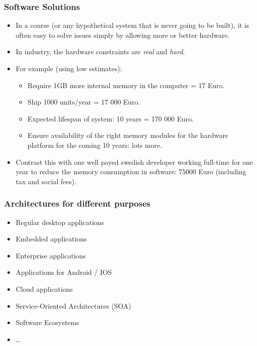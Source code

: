 \documentclass[10pt]{beamer}
\begin{document}
\begin{frame}[t]
\frametitle{Software Solutions}
\begin{itemize}
\item In a course (or any hypothetical system that is never going to be built), it is often easy to solve issues simply by allowing more or better hardware.
\item In industry, the hardware constraints are \emph{real} and \emph{hard}.
\item For example (using low estimates):
\begin{itemize}
\item Require 1GB more internal memory in the computer = 17 Euro.
\item Ship 1000 units/year = 17 000 Euro.
\item Expected lifespan of system: 10 years = 170 000 Euro.
\item Ensure availability of the right memory modules for the hardware platform for the coming 10 years: lots more.
\end{itemize}
\item Contrast this with one well payed swedish developer working full-time for one year to reduce the memory consumption in software: 75000 Euro (including tax and social fees).
\end{itemize}
\end{frame}



\begin{frame}[t]
\frametitle{Architectures for different purposes}

\begin{itemize}
\item Regular desktop applications
\item Embedded applications
\item Enterprise applications
\item Applications for Android / IOS
\item Cloud applications
\item Service-Oriented Architectures (SOA)
\item Software Ecosystems
\item \ldots
\end{itemize}
\end{frame}
\end{document}
